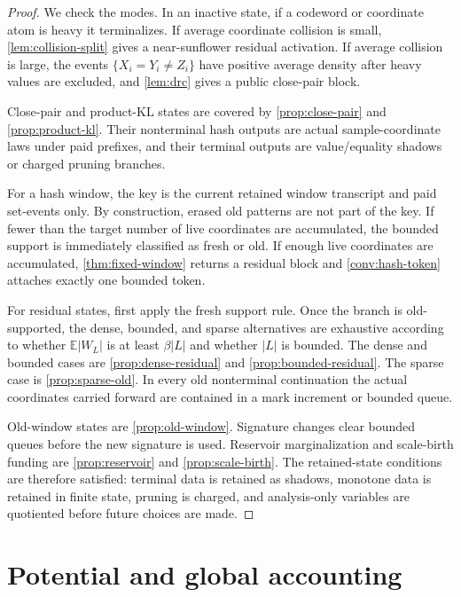 \documentclass[11pt]{article}
\newcommand{\Cref}[1]{\ref{#1}}
\theoremstyle{remark}
\newcommand{\E}{\mathbb E}
\begin{document}
\begin{proof}
We check the modes.  In an inactive state, if a codeword or coordinate atom is heavy it terminalizes.  If average coordinate collision is small, \Cref{lem:collision-split} gives a near-sunflower residual activation.  If average collision is large, the events $\{X_i=Y_i\ne Z_i\}$ have positive average density after heavy values are excluded, and \Cref{lem:drc} gives a public close-pair block.

Close-pair and product-KL states are covered by \Cref{prop:close-pair} and \Cref{prop:product-kl}.  Their nonterminal hash outputs are actual sample-coordinate laws under paid prefixes, and their terminal outputs are value/equality shadows or charged pruning branches.

For a hash window, the key is the current retained window transcript and paid set-events only.  By construction, erased old patterns are not part of the key.  If fewer than the target number of live coordinates are accumulated, the bounded support is immediately classified as fresh or old.  If enough live coordinates are accumulated, \Cref{thm:fixed-window} returns a residual block and \Cref{conv:hash-token} attaches exactly one bounded token.

For residual states, first apply the fresh support rule.  Once the branch is old-supported, the dense, bounded, and sparse alternatives are exhaustive according to whether $\E|W_L|$ is at least $\beta|L|$ and whether $|L|$ is bounded.  The dense and bounded cases are \Cref{prop:dense-residual} and \Cref{prop:bounded-residual}.  The sparse case is \Cref{prop:sparse-old}.  In every old nonterminal continuation the actual coordinates carried forward are contained in a mark increment or bounded queue.

Old-window states are \Cref{prop:old-window}.  Signature changes clear bounded queues before the new signature is used.  Reservoir marginalization and scale-birth funding are \Cref{prop:reservoir} and \Cref{prop:scale-birth}.  The retained-state conditions are therefore satisfied: terminal data is retained as shadows, monotone data is retained in finite state, pruning is charged, and analysis-only variables are quotiented before future choices are made.
\end{proof}

\section{Potential and global accounting}
\end{document}
